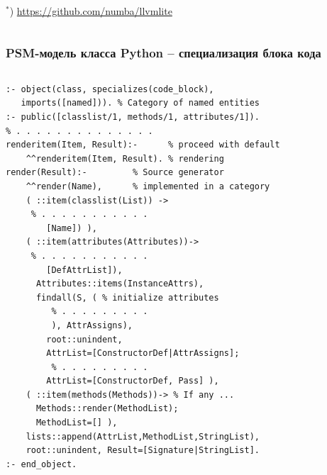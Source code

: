 \documentclass[handout]{beamer}
\begin{document}
\begin{frame}[fragile]
\begin{columns}
\begin{column}{0.4\textwidth}
  ${}^*$) \url{https://github.com/numba/llvmlite}
    \end{column}
  \end{columns}
\end{frame}

\begin{frame}[fragile]
  \frametitle{PSM-модель класса Python -- специализация блока кода}
  \begin{columns}
    \begin{column}{0.6\textwidth}
      \flushleft
\begin{verbatim}
:- object(class, specializes(code_block),
   imports([named])). % Category of named entities
:- public([classlist/1, methods/1, attributes/1]).
% . . . . . . . . . . . . . .
renderitem(Item, Result):-      % proceed with default
    ^^renderitem(Item, Result). % rendering
render(Result):-         % Source generator
    ^^render(Name),      % implemented in a category
    ( ::item(classlist(List)) ->
     % . . . . . . . . . . .
        [Name]) ),
    ( ::item(attributes(Attributes))->
     % . . . . . . . . . . .
        [DefAttrList]),
      Attributes::items(InstanceAttrs),
      findall(S, ( % initialize attributes
         % . . . . . . . . .
         ), AttrAssigns),
        root::unindent,
        AttrList=[ConstructorDef|AttrAssigns];
         % . . . . . . . . .
        AttrList=[ConstructorDef, Pass] ),
    ( ::item(methods(Methods))-> % If any ...
      Methods::render(MethodList);
      MethodList=[] ),
    lists::append(AttrList,MethodList,StringList),
    root::unindent, Result=[Signature|StringList].
:- end_object.
\end{verbatim}
    \end{column}
    \begin{column}{0.4\linewidth}

\end{column}
\end{columns}
\end{frame}
\end{document}
